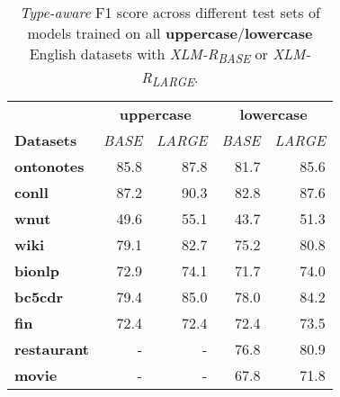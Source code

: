 \documentclass[11pt,a4paper]{article}
\begin{document}
\begin{table}[ht]
\begin{tabular}{l|rrrr}
\hline
 &\multicolumn{2}{c}{\textbf{uppercase}}& \multicolumn{2}{c}{\textbf{lowercase}} \\
\textbf{Datasets} & {\it BASE} & {\it LARGE } & \textit{BASE} & \textit{LARGE} \\ \hline
\textbf{ontonotes}                 & 85.8          & 87.8           & 81.7                      & 85.6                       \\\hline
\textbf{conll}                     & 87.2          & 90.3           & 82.8                      & 87.6                       \\\hline
\textbf{wnut}                      & 49.6          & 55.1           & 43.7                      & 51.3                       \\\hline
\textbf{wiki}                      & 79.1          & 82.7           & 75.2                      & 80.8                       \\\hline
\textbf{bionlp}                    & 72.9          & 74.1           & 71.7                      & 74.0                       \\\hline
\textbf{bc5cdr}                    & 79.4          & 85.0           & 78.0                      & 84.2                       \\\hline
\textbf{fin}                       & 72.4          & 72.4           & 72.4                      & 73.5                       \\\hline
\textbf{restaurant}                & -             & -              & 76.8                      & 80.9                       \\\hline
\textbf{movie}                     & -             & -              & 67.8                      & 71.8                       \\\hline
\end{tabular}
\caption{\label{app:cross-domain-all}
\textit{Type-aware} F1 score across different test sets of models trained on all {\bf uppercase}/{\bf lowercase} English datasets with {\it XLM-R\textsubscript{BASE}} or {\it XLM-R\textsubscript{LARGE}}.
}
\end{table}
\end{document}
